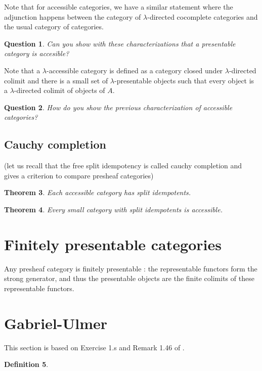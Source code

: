 \documentclass{article}
\newtheorem{theorem}{Theorem}[section]
\newtheorem{definition}[theorem]{Definition}
\newtheorem{question}[theorem]{Question}
\begin{document}
  Note that for accessible categories, we have a similar statement
  \cite[2.26]{adamek_rosicky} where the adjunction happens between the category
  of $\lambda$-directed cocomplete categories and the usual category of categories.
  \begin{question}
   Can you show with these characterizations that a presentable category is
   accesible? 
  \end{question}
  Note that a $\lambda$-accessible category is defined as a category closed
  under $\lambda$-directed colimit and there is a small set of
  $\lambda$-presentable objects such that every object is a $\lambda$-directed
  colimit of objects of $A$.
  \begin{question}
    How do you show the previous characterization of accessible categories?
\end{question}
\subsection{Cauchy completion}
(let us recall that the free split idempotency is called cauchy completion and
gives a criterion to compare presheaf categories)
\begin{theorem}
  \cite[2.4]{adamek_rosicky}
 Each accessible category has split idempotents. 
\end{theorem}
\begin{theorem}
 Every small category with split idempotents is accessible. 
\end{theorem}
\section{Finitely presentable categories}
Any presheaf category is finitely presentable \cite{adamek_rosicky}: the
representable functors form the strong generator, and thus the presentable
objects are the finite colimits of these representable functors.

\section{Gabriel-Ulmer}
This section is based on Exercise 1.s and Remark 1.46 of \cite{adamek_rosicky}.
\begin{definition}
  
\end{definition}
\end{document}

